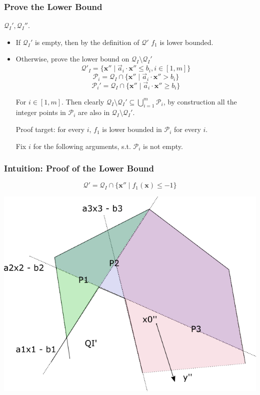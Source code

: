 \documentclass[11pt]{beamer}
\begin{document}
\begin{frame}\frametitle{Prove the Lower Bound}
$\mathcal{Q}_I', \mathcal{Q}_I''$.
\begin{itemize}
\item If $\mathcal{Q}_I'$ is empty, then by the definition of $\mathcal{Q}'$ $f_1$ is lower bounded.

\item Otherwise, prove the lower bound on $\mathcal{Q}_I \setminus \mathcal{Q}_I'$
\[\mathcal{Q}'_I = \{\textbf{x}'' \mid \vec{a}_i\cdot \textbf{x}'' \le b_i, i \in [1, m]\}\]
\[\mathcal{P}_i = \mathcal{Q}_I \cap \{\textbf{x}''\mid \vec{a}_i \cdot \textbf{x}'' > b_i\}\]
\[\mathcal{P}_i' = \mathcal{Q}_I \cap \{\textbf{x}''\mid \vec{a}_i \cdot \textbf{x}'' \ge b_i\}\]

For $i\in [1, m]$.
Then clearly $\mathcal{Q}_I\setminus \mathcal{Q}_I' \subseteq \bigcup_{i = 1}^{m} \mathcal{P}_i$, by construction all the integer points in $\mathcal{P}_i$ are also in $\mathcal{Q}_I\setminus \mathcal{Q}_I'$.

Proof target: for every $i$, $f_1$ is lower bounded in $\mathcal{P}_i$ for every $i$.

Fix $i$ for the following arguments, s.t. $\mathcal{P}_i$ is not empty.



\end{itemize}


\end{frame}

\begin{frame}\frametitle{Intuition: Proof of the Lower Bound}
\[\mathcal{Q}' = \mathcal{Q}_I\cap \{\textbf{x}''\mid f_1(\textbf{x}) \le -1\}\]
\begin{center}
\includegraphics[scale = 0.4]{lowerbound.png}
\end{center}
\end{frame}
\end{document}
